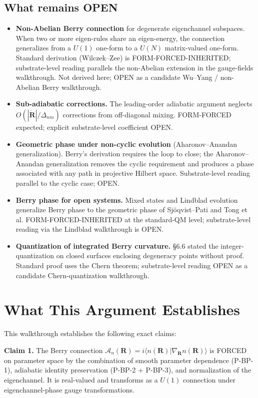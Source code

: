 \documentclass[11pt,a4paper]{article}
\begin{document}
\subsection*{What remains OPEN}

\begin{itemize}[noitemsep]
  \item \textbf{Non-Abelian Berry connection} for degenerate eigenchannel subspaces. When two or more eigen-rules share an eigen-energy, the connection generalizes from a $U(1)$ one-form to a $U(N)$ matrix-valued one-form. Standard derivation (Wilczek--Zee) is FORM-FORCED-INHERITED; substrate-level reading parallels the non-Abelian extension in the gauge-fields walkthrough. Not derived here; OPEN as a candidate Wu--Yang / non-Abelian Berry walkthrough.
  \item \textbf{Sub-adiabatic corrections.} The leading-order adiabatic argument neglects $O(|\dot{\mathbf{R}}|/\Delta_{nm})$ corrections from off-diagonal mixing. FORM-FORCED expected; explicit substrate-level coefficient OPEN.
  \item \textbf{Geometric phase under non-cyclic evolution} (Aharonov--Anandan generalization). Berry's derivation requires the loop to close; the Aharonov--Anandan generalization removes the cyclic requirement and produces a phase associated with any path in projective Hilbert space. Substrate-level reading parallel to the cyclic case; OPEN.
  \item \textbf{Berry phase for open systems.} Mixed states and Lindblad evolution generalize Berry phase to the geometric phase of Sj\"oqvist--Pati and Tong et al. FORM-FORCED-INHERITED at the standard-QM level; substrate-level reading via the Lindblad walkthrough is OPEN.
  \item \textbf{Quantization of integrated Berry curvature.} \S6.6 stated the integer-quantization on closed surfaces enclosing degeneracy points without proof. Standard proof uses the Chern theorem; substrate-level reading OPEN as a candidate Chern-quantization walkthrough.
\end{itemize}

\section{What This Argument Establishes}

This walkthrough establishes the following exact claims:

\textbf{Claim 1.} The Berry connection $\mathcal{A}_n(\mathbf{R}) = i\langle n(\mathbf{R})|\nabla_\mathbf{R} n(\mathbf{R})\rangle$ is FORCED on parameter space by the combination of smooth parameter dependence (P-BP-1), adiabatic identity preservation (P-BP-2 + P-BP-3), and normalization of the eigenchannel. It is real-valued and transforms as a $U(1)$ connection under eigenchannel-phase gauge transformations.
\end{document}
